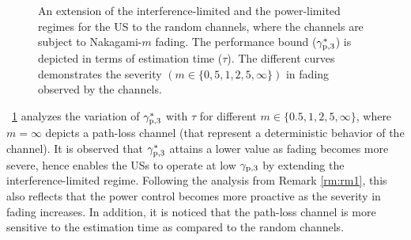 \begin{figure}[!ht]
\caption{An extension of the interference-limited and the power-limited regimes for the US to the random channels, where the channels are subject to Nakagami-$m$ fading. The performance bound (${\gamma}_{\text{p,3}}^*$) is depicted in terms of estimation time ($\tau$). The different curves demonstrates the severity $(m \in \{0,5,1,2,5, \infty \})$ in fading observed by the channels.}
\label{fig:or_fad}
\end{figure}
\begin{remark} \label{rm:rm2}
\normalfont
\figurename~\ref{fig:or_fad} analyzes the variation of ${\gamma}_{\text{p,3}}^*$ with $\tau$ for different $m \in \{0.5, 1, 2, 5, \infty\}$, where $m = \infty$ depicts a path-loss channel (that represent a deterministic behavior of the channel). It is observed that ${\gamma}_{\text{p,3}}^*$ attains a lower value as fading becomes more severe, hence enables the USs to operate at low ${\gamma}_{\text{p,3}}$ by extending the interference-limited regime. Following the analysis from Remark \ref{rm:rm1}, this also reflects that the power control becomes more proactive as the severity in fading increases. In addition, it is noticed that the path-loss channel is more sensitive to the estimation time as compared to the random channels.  
\end{remark}

